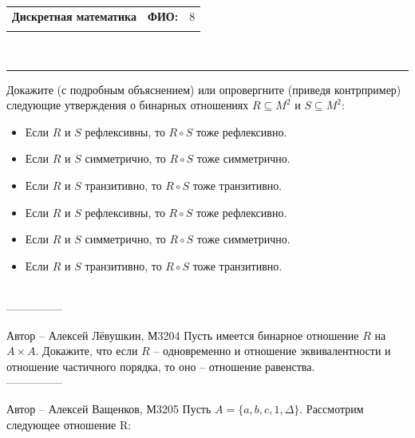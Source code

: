 \documentclass[10pt]{exam}
\newcommand{\class}{Дискретная математика}
\newcommand{\examdate}{}
\begin{document}
\newpage
\begin{flushright}
\begin{tabular}{p{2.8in} r l}
\textbf{\class} & \textbf{ФИО:} &8\\

\textbf{\examdate} &&\\
\end{tabular}\\
\end{flushright}
\rule[1ex]{\textwidth}{.1pt}


\begin{questions}
\question
Докажите (с подробным объяснением) или опровергните (приведя контрпример) следующие утверждения о бинарных отношениях $R \subseteq M^2$ и $S \subseteq M^2$:
\begin{itemize}
    \item Если $R$ и $S$ рефлексивны, то $R \circ S$ тоже рефлексивно.
    \item Если $R$ и $S$ симметрично, то $R \circ S$ тоже симметрично.
    \item Если $R$ и $S$ транзитивно, то $R \circ S$ тоже транзитивно.
    \item Если $R$ и $S$ рефлексивны, то $R \circ S$ тоже рефлексивно.
    \item Если $R$ и $S$ симметрично, то $R \circ S$ тоже симметрично.
    \item Если $R$ и $S$ транзитивно, то $R \circ S$ тоже транзитивно.
\end{itemize}
\\
---------------

Автор -- Алексей Лёвушкин, М3204\question
Пусть имеется бинарное отношение $R$ на $ A \times A$. Докажите, что если $R$ -- одновременно и отношение эквивалентности и отношение частичного порядка, то оно -- отношение равенства.
\\
---------------

Автор -- Алексей Ващенков, М3205\question
Пусть $A = \{a, b, c, 1, \Delta\}$. Рассмотрим следующее отношение R:


\end{questions}
\end{document}

